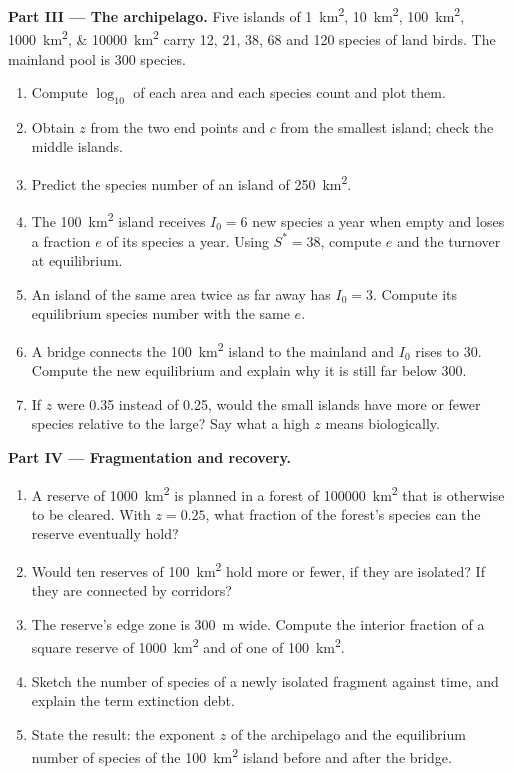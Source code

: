 \begin{problem}
\medskip
\noindent\textbf{Part III --- The archipelago.}
Five islands of \qtylist{1;10;100;1000;10000}{km^2} carry \num{12}, \num{21}, \num{38}, \num{68} and
\num{120} species of land birds. The mainland pool is \num{300}
species.
\begin{enumerate}[resume]
  \item Compute $\log_{10}$ of each area and each species count and
        plot them.
  \item Obtain $z$ from the two end points and $c$ from the smallest
        island; check the middle islands.
  \item Predict the species number of an island of \qty{250}{km^2}.
  \item The \qty{100}{km^2} island receives $I_0 = 6$ new species a year
        when empty and loses a fraction $e$ of its species a year.
        Using $S^* = 38$, compute $e$ and the turnover at equilibrium.
  \item An island of the same area twice as far away has $I_0 = 3$.
        Compute its equilibrium species number with the same $e$.
  \item A bridge connects the \qty{100}{km^2} island to the mainland
        and $I_0$ rises to \num{30}. Compute the new equilibrium and
        explain why it is still far below \num{300}.
  \item If $z$ were \num{0.35} instead of \num{0.25}, would the small
        islands have more or fewer species relative to the large? Say
        what a high $z$ means biologically.
\end{enumerate}

\medskip
\noindent\textbf{Part IV --- Fragmentation and recovery.}
\begin{enumerate}[resume]
  \item A reserve of \qty{1000}{km^2} is planned in a forest of
        \qty{100000}{km^2} that is otherwise to be cleared. With $z =
        0.25$, what fraction of the forest's species can the reserve
        eventually hold?
  \item Would ten reserves of \qty{100}{km^2} hold more or fewer, if
        they are isolated? If they are connected by corridors?
  \item The reserve's edge zone is \qty{300}{m} wide. Compute the
        interior fraction of a square reserve of \qty{1000}{km^2} and
        of one of \qty{100}{km^2}.
  \item Sketch the number of species of a newly isolated fragment
        against time, and explain the term extinction debt.
  \item State the result: the exponent $z$ of the archipelago and the
        equilibrium number of species of the \qty{100}{km^2} island
        before and after the bridge.
\end{enumerate}
\end{problem}
